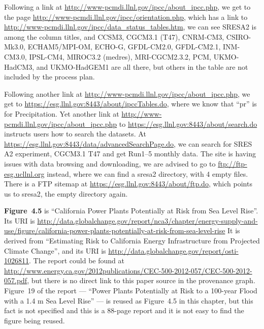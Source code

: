 Following a link at \url{http://www-pcmdi.llnl.gov/ipcc/about_ipcc.php}, we get to the page \url{http://www-pcmdi.llnl.gov/ipcc/orientation.php}, which has a link to \url{http://www-pcmdi.llnl.gov/ipcc/data_status_tables.htm}, we can see SRESA2 is among the column titles, and CCSM3, CGCM3.1 (T47), CNRM-CM3, CSIRO-Mk3.0, ECHAM5/MPI-OM, ECHO-G, GFDL-CM2.0, GFDL-CM2.1, INM-CM3.0, IPSL-CM4, MIROC3.2 (medres), MRI-CGCM2.3.2, PCM, UKMO-HadCM3, and UKMO-HadGEM1 are all there, but others in the table are not included by the process plan.

Following another link at \url{http://www-pcmdi.llnl.gov/ipcc/about_ipcc.php}, we get to \url{https://esg.llnl.gov:8443/about/ipccTables.do}, where we know that ``pr'' is for Precipitation.
Yet another link at \url{http://www-pcmdi.llnl.gov/ipcc/about_ipcc.php}  to \url{https://esg.llnl.gov:8443/about/search.do} instructs users how to search the datasets.
At \url{https://esg.llnl.gov:8443/data/advancedSearchPage.do}, we can search for SRES A2 experiment, CGCM3.1 T47 and get Run1--5 monthly data.
The site is having issues with data browsing and downloading, we are advised to go to \url{ftp://ftp-esg.ucllnl.org} instead, where we can find a sresa2 directory, with 4 empty files. There is a FTP sitemap at \url{https://esg.llnl.gov:8443/about/ftp.do}, which points us to sresa2, the empty directory again.

\textbf{Figure~4.5} is ``California Power Plants Potentially at Risk from Sea Level Rise''.
Its URI is \url{http://data.globalchange.gov/report/nca3/chapter/energy-supply-and-use/figure/california-power-plants-potentially-at-risk-from-sea-level-rise}
It is derived from ``Estimating Risk to California Energy Infrastructure from Projected Climate Change'', and its
URI is \url{http://data.globalchange.gov/report/osti-1026811}. 
The report could be found at \url{http://www.energy.ca.gov/2012publications/CEC-500-2012-057/CEC-500-2012-057.pdf}, but there is no direct link to this paper source in the provenance graph.
Figure~19 of the report --- ``Power Plants Potentially at Risk to a 100-year Flood with a 1.4 m Sea Level Rise'' --- is reused as Figure~4.5 in this chapter, but this fact is not specified and this is a 88-page report and it is not easy to find the figure being reused.


